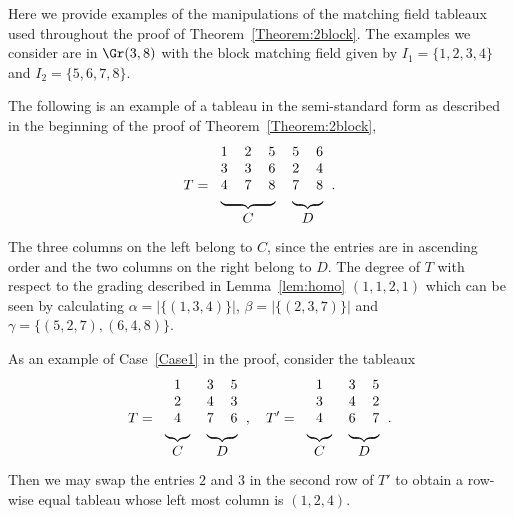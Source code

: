 

\begin{exam} \label{example:thm2blockillustration}
Here we provide examples of the manipulations of the matching field tableaux used throughout the proof of Theorem~\ref{Theorem:2block}. 
The examples we consider are in $\Gr(3,8)$ with the block matching field given by $I_1 = \{1,2,3,4 \}$ and $I_2 = \{5,6,7,8\}$.


The following is an example of a tableau in the semi-standard form as described in the beginning of the proof of Theorem~\ref{Theorem:2block}, 
\[
T = 
\begin{tabular}{ccccc}
 1 & 2 & 5 & 5 & 6 \\
 3 & 3 & 6 & 2 & 4 \\
 4 & 7 & 8 & 7 & 8 \\
 \multicolumn{3}{c}{\upbracefill} & \multicolumn{2}{c}{\upbracefill}\\
 \multicolumn{3}{c}{$C$} & \multicolumn{2}{c}{$D$}\\
\end{tabular}.
\]
The three columns on the left belong to $C$, since the entries are in ascending order and the two columns on the right belong to $D$. The degree of $T$ with respect to the grading described in Lemma~\ref{lem:homo} $(1,1,2,1)$ which can be seen by calculating $\alpha = |\{(1,3,4)\}|$, $\beta = |\{(2,3,7)\}|$ and $\gamma = \{(5,2,7), (6,4,8)\}$. 


As an example of Case~\ref{Case1} in the proof, consider the tableaux
\[
T = 
\begin{tabular}{ccc}
 1 & 3 & 5 \\
 2 & 4 & 3 \\
 4 & 7 & 6 \\
 \multicolumn{1}{c}{\upbracefill} & \multicolumn{2}{c}{\upbracefill}\\
 \multicolumn{1}{c}{$C$} & \multicolumn{2}{c}{$D$}\\
\end{tabular}, 
\quad
T' = 
\begin{tabular}{ccc}
 1 & 3 & 5 \\
 3 & 4 & 2 \\
 4 & 6 & 7 \\
 \multicolumn{1}{c}{\upbracefill} & \multicolumn{2}{c}{\upbracefill}\\
 \multicolumn{1}{c}{$C$} & \multicolumn{2}{c}{$D$}\\
\end{tabular}.
\]
Then we may swap the entries $2$ and $3$ in the second row of $T'$ to obtain a row-wise equal tableau whose left most column is $(1,2,4)$. 


\end{exam}

